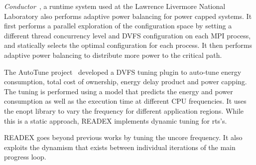 \textit{Conductor}~\cite{Marathe}, a runtime system used at the Lawrence Livermore National Laboratory also performs adaptive power balancing for power capped systems. It first performs a parallel exploration of the configuration space by setting a different thread concurrency level and DVFS configuration on each MPI process, and statically selects the optimal configuration for each process. It then performs adaptive power balancing to distribute more power to the critical path.

The AutoTune project~\cite{guillen2016dvfs,AutoTune:Book2015} developed a DVFS tuning plugin to auto-tune energy consumption, total cost of ownership, energy delay product and power capping. The tuning is performed using a model that predicts the energy and power consumption as well as the execution time at different CPU frequencies. It uses the enopt library to vary the frequency for different application regions. While this is a static approach, READEX implements dynamic tuning for rts's.

READEX goes beyond previous works by tuning the uncore frequency. It also exploits the dynamism that exists between individual iterations of the main progress loop.

